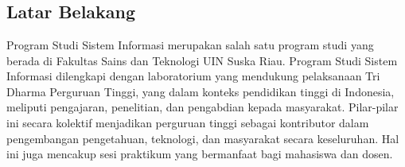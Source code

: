 %
%
%
%

\chapter{\babSatu}

\section{Latar Belakang}
Program Studi Sistem Informasi merupakan salah satu program studi yang berada di Fakultas Sains dan Teknologi UIN Suska Riau. Program Studi Sistem Informasi dilengkapi dengan laboratorium yang mendukung pelaksanaan Tri Dharma Perguruan Tinggi, yang dalam konteks pendidikan tinggi di Indonesia, meliputi pengajaran, penelitian, dan pengabdian kepada masyarakat. Pilar-pilar ini secara kolektif menjadikan perguruan tinggi sebagai kontributor dalam pengembangan pengetahuan, teknologi, dan masyarakat secara keseluruhan. Hal ini juga mencakup sesi praktikum yang bermanfaat bagi mahasiswa dan dosen.

